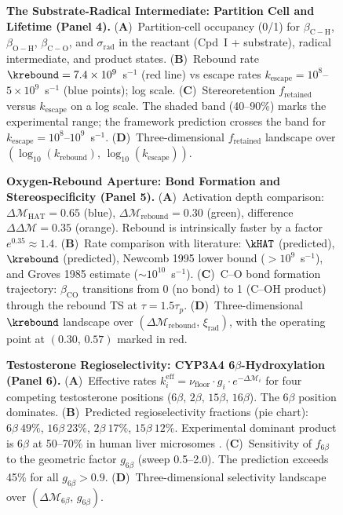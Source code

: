 \begin{figure}[htbp]
\caption{\textbf{The Substrate-Radical Intermediate: Partition Cell and Lifetime (Panel 4).}
(\textbf{A})~Partition-cell occupancy (0/1) for $\beta_{\mathrm{C-H}}$,
$\beta_{\mathrm{O-H}}$, $\beta_{\mathrm{C-O}}$, and $\sigma_{\mathrm{rad}}$ in the
reactant (Cpd~I + substrate), radical intermediate, and product states.
(\textbf{B})~Rebound rate $\krebound = 7.4 \times 10^9$~s$^{-1}$ (red line) vs
escape rates $k_{\mathrm{escape}} = 10^8$--$5 \times 10^9$~s$^{-1}$ (blue points);
log scale.
(\textbf{C})~Stereoretention $f_{\mathrm{retained}}$ versus $k_{\mathrm{escape}}$ on
a log scale. The shaded band (40--90\%) marks the experimental range; the framework
prediction crosses the band for $k_{\mathrm{escape}} = 10^8$--$10^9$~s$^{-1}$.
(\textbf{D})~Three-dimensional $f_{\mathrm{retained}}$ landscape over
$(\log_{10}(k_{\mathrm{rebound}}),\, \log_{10}(k_{\mathrm{escape}}))$.}
\label{fig:radical_intermediate}
\end{figure}

\begin{figure}[htbp]
\caption{\textbf{Oxygen-Rebound Aperture: Bond Formation and Stereospecificity (Panel 5).}
(\textbf{A})~Activation depth comparison: $\Delta\mathcal{M}_{\mathrm{HAT}} = 0.65$
(blue), $\Delta\mathcal{M}_{\mathrm{rebound}} = 0.30$ (green), difference
$\Delta\Delta\mathcal{M} = 0.35$ (orange). Rebound is intrinsically faster by a factor
$e^{0.35} \approx 1.4$.
(\textbf{B})~Rate comparison with literature: $\kHAT$ (predicted), $\krebound$
(predicted), Newcomb 1995 lower bound ($> 10^9$~s$^{-1}$), and Groves 1985 estimate
($\sim 10^{10}$~s$^{-1}$).
(\textbf{C})~C--O bond formation trajectory: $\beta_{\mathrm{CO}}$ transitions from 0
(no bond) to 1 (C--OH product) through the rebound TS at $\tau = 1.5 \tau_p$.
(\textbf{D})~Three-dimensional $\krebound$ landscape over
$(\Delta\mathcal{M}_{\mathrm{rebound}},\, \xi_{\mathrm{rad}})$, with the operating
point at $(0.30,\, 0.57)$ marked in red.}
\label{fig:rebound}
\end{figure}

\begin{figure}[htbp]
\caption{\textbf{Testosterone Regioselectivity: CYP3A4 6$\beta$-Hydroxylation (Panel 6).}
(\textbf{A})~Effective rates $k_i^{\mathrm{eff}} = \nu_{\mathrm{floor}} \cdot g_i \cdot
e^{-\Delta\mathcal{M}_i}$ for four competing testosterone positions
($6\beta,\, 2\beta,\, 15\beta,\, 16\beta$). The $6\beta$ position dominates.
(\textbf{B})~Predicted regioselectivity fractions (pie chart): $6\beta\ 49\%$,
$16\beta\ 23\%$, $2\beta\ 17\%$, $15\beta\ 12\%$. Experimental dominant product
is $6\beta$ at 50--70\% in human liver microsomes \citep{guengerich1998}.
(\textbf{C})~Sensitivity of $f_{6\beta}$ to the geometric factor $g_{6\beta}$
(sweep 0.5--2.0). The prediction exceeds 45\% for all $g_{6\beta} > 0.9$.
(\textbf{D})~Three-dimensional selectivity landscape over
$(\Delta\mathcal{M}_{6\beta},\, g_{6\beta})$.}
\label{fig:regioselectivity}
\end{figure}

